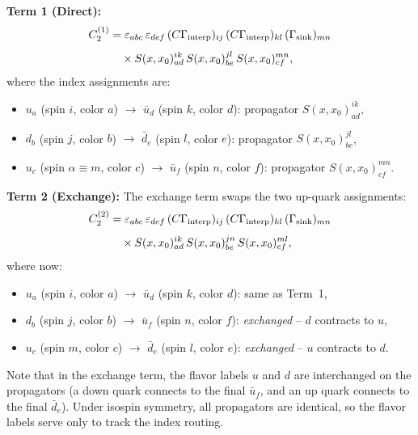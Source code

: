 \documentclass[11pt,a4paper]{article}
\newcommand{\eps}{\varepsilon}
\newcommand{\Gammaint}{\Gamma_{\text{interp}}}
\newcommand{\Gammasink}{\Gamma_{\text{sink}}}
\newcommand{\Cmat}{C}
\begin{document}
\medskip\noindent
\textbf{Term 1 (Direct):}
\begin{align}
  C_2^{(1)} &=
  \eps_{abc}\, \eps_{def}\,
  (\Cmat\Gammaint)_{ij}\,
  (\Cmat\Gammaint)_{kl}\,
  (\Gammasink)_{mn} \notag \\[4pt]
  &\quad\times
  S(x,x_0)^{ik}_{ad}\,
  S(x,x_0)^{jl}_{be}\,
  S(x,x_0)^{mn}_{cf},
  \label{eq:term1_full}
\end{align}
where the index assignments are:
\begin{itemize}
  \item $u_a$ (spin $i$, color $a$) $\to$ $\bar{u}_d$ (spin $k$, color $d$):
    propagator $S(x,x_0)^{ik}_{ad}$,
  \item $d_b$ (spin $j$, color $b$) $\to$ $\bar{d}_e$ (spin $l$, color $e$):
    propagator $S(x,x_0)^{jl}_{be}$,
  \item $u_c$ (spin $\alpha \equiv m$, color $c$) $\to$ $\bar{u}_f$ (spin $n$, color $f$):
    propagator $S(x,x_0)^{mn}_{cf}$.
\end{itemize}

\medskip\noindent
\textbf{Term 2 (Exchange):}
The exchange term swaps the two up-quark assignments:
\begin{align}
  C_2^{(2)} &=
  \eps_{abc}\, \eps_{def}\,
  (\Cmat\Gammaint)_{ij}\,
  (\Cmat\Gammaint)_{kl}\,
  (\Gammasink)_{mn} \notag \\[4pt]
  &\quad\times
  S(x,x_0)^{ik}_{ad}\,
  S(x,x_0)^{jn}_{be}\,
  S(x,x_0)^{ml}_{cf},
  \label{eq:term2_full}
\end{align}
where now:
\begin{itemize}
  \item $u_a$ (spin $i$, color $a$) $\to$ $\bar{u}_d$ (spin $k$, color $d$):
    same as Term~1,
  \item $d_b$ (spin $j$, color $b$) $\to$ $\bar{u}_f$ (spin $n$, color $f$):
    \emph{exchanged} -- $d$ contracts to $u$,
  \item $u_c$ (spin $m$, color $c$) $\to$ $\bar{d}_e$ (spin $l$, color $e$):
    \emph{exchanged} -- $u$ contracts to $d$.
\end{itemize}

Note that in the exchange term, the flavor labels $u$ and $d$ are interchanged on the
propagators (a down quark connects to the final $\bar{u}_f$, and an up quark connects
to the final $\bar{d}_e$). Under isospin symmetry, all propagators are identical, so the
flavor labels serve only to track the index routing.
\end{document}
